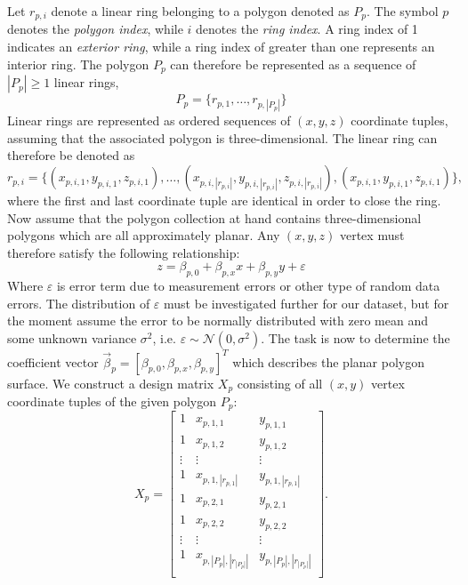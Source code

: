 Let $r_{p,i}$ denote a linear ring belonging to a polygon denoted as $P_p$.
The symbol $p$ denotes the \textit{polygon index}, while $i$ denotes the \textit{ring index}.
A ring index of 1 indicates an \textit{exterior ring}, while a ring index of greater than one represents an interior ring.
The polygon $P_p$ can therefore be represented as a sequence of $|P_p| \geq 1$ linear rings,
%
\begin{equation*}
P_p = \{ r_{p,1}, \dots, r_{p, |P_p|}\}
\end{equation*}
%
Linear rings are represented as ordered sequences of $(x, y, z)$ coordinate tuples, assuming that the associated polygon is three-dimensional.
The linear ring can therefore be denoted as
%
\begin{equation*}
  r_{p,i}
  =
  \{
    (x_{p,i,1}, y_{p,i,1}, z_{p,i,1}),
    \dots,
    (x_{p,i,|r_{p, i}|}, y_{p,i,|r_{p, i}|}, z_{p,i,|r_{p, i}|}),
    (x_{p,i,1}, y_{p,i,1}, z_{p,i,1})
  \},
\end{equation*}
%
where the first and last coordinate tuple are identical in order to close the ring.
Now assume that the polygon collection at hand contains three-dimensional polygons which are all approximately planar.
Any $(x, y, z)$ vertex must therefore satisfy the following relationship:
%
\begin{equation*}
  z = \beta_{p,0} + \beta_{p,x} x + \beta_{p,y} y + \varepsilon
\end{equation*}
%
Where $\varepsilon$ is error term due to measurement errors or other type of random data errors.
The distribution of $\varepsilon$ must be investigated further for our dataset, but for the moment assume the error to be normally distributed with zero mean and some unknown variance $\sigma^2$, i.e. $\varepsilon \sim \mathcal{N}(0, \sigma^2)$.
%
The task is now to determine the coefficient vector $\vec{\beta}_p = {[\beta_{p,0}, \beta_{p,x}, \beta_{p,y}]}^T$ which describes the planar polygon surface.
We construct a design matrix $X_p$ consisting of all $(x, y)$ vertex coordinate tuples of the given polygon $P_p$:
%
\begin{equation*}
  X_p
  =
  \begin{bmatrix}
    1 & x_{p,1,1} & y_{p,1,1} \\
    1 & x_{p,1,2} & y_{p,1,2} \\
    \vdots & \vdots & \vdots \\
    1 & x_{p,1,|r_{p,1}|} & y_{p,1,|r_{p,1}|} \\
    1 & x_{p,2,1} & y_{p,2,1} \\
    1 & x_{p,2,2} & y_{p,2,2} \\
    \vdots & \vdots & \vdots \\
    1 & x_{p,|P_p|,|r_{|P_p|}|} & y_{p,|P_p|,|r_{|P_p|}|} \\
  \end{bmatrix}.
\end{equation*}
